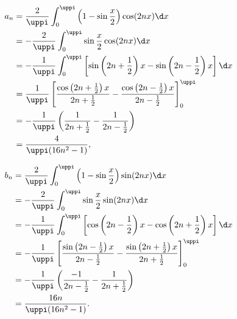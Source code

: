 \begin{solution}
    \begin{equation}
        \begin{aligned}
            a_n & = \frac{2}{\uppi} \int_{0}^{\uppi} \left( 1 - \sin \frac{x}{2} \right) \cos(2nx) \d x                                                                                  \\
                & = -\frac{2}{\uppi} \int_{0}^{\uppi} \sin \frac{x}{2} \cos(2nx) \d x                                                                                                    \\
                & = -\frac{1}{\uppi} \int_{0}^{\uppi} \left[ \sin\left( 2n + \frac{1}{2} \right)x - \sin\left( 2n - \frac{1}{2} \right)x \right] \d x                                    \\
                & = \frac{1}{\uppi} \left[ \frac{\cos\left(2n + \frac{1}{2}\right)x}{2n + \frac{1}{2}} - \frac{\cos\left(2n - \frac{1}{2}\right)x}{2n - \frac{1}{2}} \right]_{0}^{\uppi} \\
                & = -\frac{1}{\uppi} \left( \frac{1}{2n + \frac{1}{2}} - \frac{1}{2n - \frac{1}{2}} \right)                                                                              \\
                & = \frac{4}{\uppi(16n^2 - 1)},
        \end{aligned}
    \end{equation}

    \begin{equation}
        \begin{aligned}
            b_n & = \frac{2}{\uppi} \int_{0}^{\uppi} \left( 1 - \sin \frac{x}{2} \right) \sin(2nx) \d x                                                                                   \\
                & = -\frac{2}{\uppi} \int_{0}^{\uppi} \sin \frac{x}{2} \sin(2nx) \d x                                                                                                     \\
                & = -\frac{1}{\uppi} \int_{0}^{\uppi} \left[ \cos\left( 2n - \frac{1}{2} \right)x - \cos\left( 2n + \frac{1}{2} \right)x \right] \d x                                     \\
                & = -\frac{1}{\uppi} \left[ \frac{\sin\left(2n - \frac{1}{2}\right)x}{2n - \frac{1}{2}} - \frac{\sin\left(2n + \frac{1}{2}\right)x}{2n + \frac{1}{2}} \right]_{0}^{\uppi} \\
                & = -\frac{1}{\uppi} \left( \frac{-1}{2n - \frac{1}{2}} - \frac{1}{2n + \frac{1}{2}} \right)                                                                              \\
                & = \frac{16n}{\uppi(16n^2 - 1)}.
        \end{aligned}
    \end{equation}


\end{solution}
